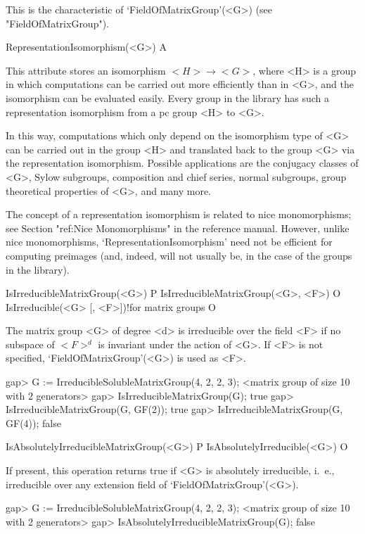 This is the characteristic of `FieldOfMatrixGroup'(<G>) (see "FieldOfMatrixGroup").


\>RepresentationIsomorphism(<G>) A

This attribute stores an isomorphism $<H> \to <G>$, where <H> is a group
in which computations can be carried out more efficiently than in <G>, and 
the isomorphism can be evaluated easily. Every group in the {\IRREDSOL} library
has such a representation isomorphism from a pc group <H> to <G>.

In this way, computations which only depend on the 
isomorphism type of <G> can be carried out in the group <H> and translated
back to the group <G> via the representation isomorphism. Possible applications are the conjugacy classes of <G>, Sylow subgroups, composition and chief series, normal subgroups, group theoretical properties of <G>, and many more. 

The concept of a representation isomorphism is related to 
nice monomorphisms; see Section "ref:Nice Monomorphisms" in the {\GAP} 
reference manual. However, unlike nice monomorphisms, 
`RepresentationIsomorphism' need not be efficient for computing preimages (and, indeed, will not usually be, in the case of the groups in the {\IRREDSOL} library). 



\>IsIrreducibleMatrixGroup(<G>) P
\>IsIrreducibleMatrixGroup(<G>, <F>) O
\>IsIrreducible(<G> [, <F>])!{for matrix groups} O

The matrix group <G> of degree <d> is irreducible over the field <F> if no subspace of $<F>^d$ is
invariant under the action of <G>. If <F> is not
specified, `FieldOfMatrixGroup'(<G>) is used as <F>.

\beginexample
gap> G := IrreducibleSolubleMatrixGroup(4, 2, 2, 3);
<matrix group of size 10 with 2 generators>
gap> IsIrreducibleMatrixGroup(G);
true
gap> IsIrreducibleMatrixGroup(G, GF(2));
true
gap> IsIrreducibleMatrixGroup(G, GF(4));
false
\endexample

\>IsAbsolutelyIrreducibleMatrixGroup(<G>) P
\>IsAbsolutelyIrreducible(<G>) O

If present, this operation returns true if <G> is absolutely irreducible, i.~e., irreducible over any
extension field of `FieldOfMatrixGroup'(<G>).

\beginexample
gap> G := IrreducibleSolubleMatrixGroup(4, 2, 2, 3);
<matrix group of size 10 with 2 generators>
gap> IsAbsolutelyIrreducibleMatrixGroup(G);
false
\endexample


